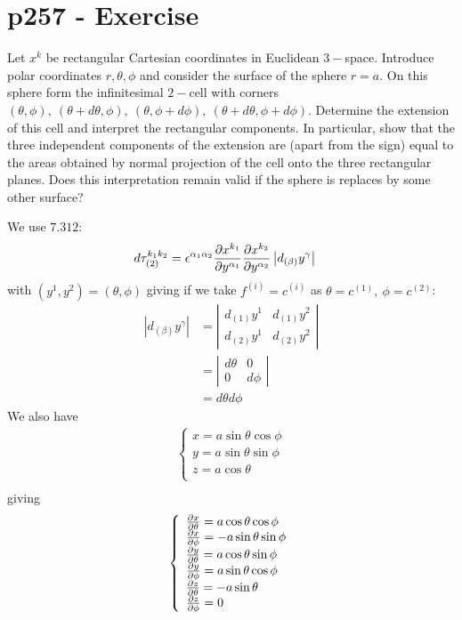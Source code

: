 \section{p257 - Exercise }
\begin{tcolorbox}
Let $x^k$ be rectangular Cartesian coordinates in Euclidean $3-$space. Introduce polar coordinates $r,\theta,\phi$ and consider the surface of the sphere $r=a$. On this sphere form the infinitesimal $2-$cell with corners $(\theta,\phi),\ (\theta+d\theta,\phi),\ (\theta,\phi+d\phi),\ (\theta+d\theta,\phi+d\phi)$. Determine the extension of this cell and interpret the rectangular components. In particular, show that the three independent components of the extension are (apart from the sign) equal to the areas obtained by normal projection of the cell onto the three rectangular planes. Does this interpretation remain valid if the sphere is replaces by some other surface?
\end{tcolorbox}
We use $\mathbf{7.312}$:
\begin{align}
d\tau_{(2)}^{k_1k_2}&= \epsilon^{\alpha_1\alpha_2}\pdv{x^{k_1}}{y^{\alpha_1}}\pdv{x^{k_2}}{y^{\alpha_2}}\left|d_{(\beta)}y^{\gamma}\right|
\end{align}
with $(y^1, y^2)= (\theta,\phi)$ giving if we take $f^{(i)}=c^{(i)} $ as $\theta=c^{(1)},\ \phi =c^{(2)} $:
\begin{align}
\left|d_{(\beta)}y^{\gamma}\right|&=\left|\begin{matrix}d_{(1)}y^{1}&d_{(1)}y^{2}\\
d_{(2)}y^{1}&d_{(2)}y^{2}\end{matrix}\right|\\
&=\left|\begin{matrix}d{\theta}&0\\
0&d{\phi}\end{matrix}\right|\\
&= d{\theta}d{\phi}
\end{align}
We also have
\begin{align}
\left\{\begin{array}{l}
x= a\sin{\theta}\cos{\phi}\\
y= a\sin{\theta}\sin{\phi}\\
z= a\cos{\theta}\\
\end{array}\right.\\
\end{align}
giving
\begin{align}
\left\{\begin{array}{l}
\pdv{x}{\theta}= a\cos{\theta}\cos{\phi}\\
\pdv{x}{\phi}= -a\sin{\theta}\sin{\phi}\\
\pdv{y}{\theta}= a\cos{\theta}\sin{\phi}\\
\pdv{y}{\phi}=  a\sin{\theta}\cos{\phi}\\
\pdv{z}{\theta}= -a\sin{\theta}\\
\pdv{z}{\phi}= 0\\
\end{array}\right.\\
\end{align}

